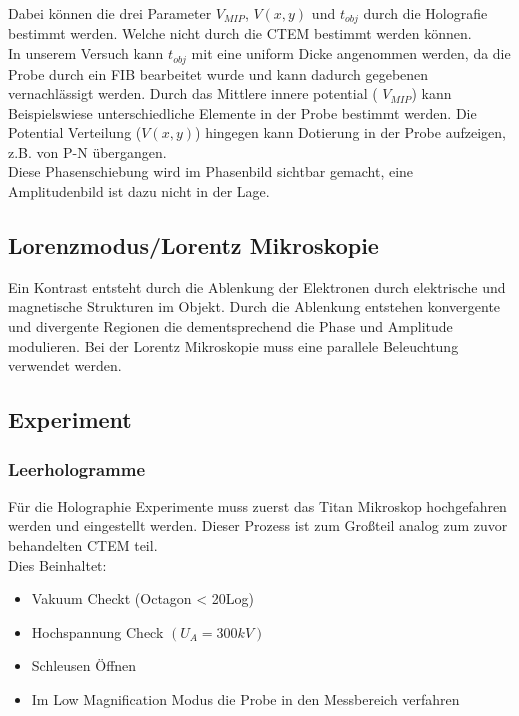 Dabei können die drei Parameter \(V_{MIP}\), \(V(x,y)\) und \(t_{obj}\) durch die Holografie bestimmt werden. Welche nicht durch die CTEM bestimmt werden können.\\
In unserem Versuch kann \(t_{obj}\) mit eine uniform Dicke angenommen werden, da die Probe durch ein FIB bearbeitet wurde und kann dadurch gegebenen vernachlässigt werden. Durch das Mittlere innere potential ( \(V_{MIP}\)) kann Beispielswiese unterschiedliche Elemente in der Probe bestimmt werden. Die Potential Verteilung (\(V(x,y)\)) hingegen kann Dotierung in der Probe aufzeigen, z.B. von P-N übergangen.\\
Diese Phasenschiebung wird im Phasenbild sichtbar gemacht, eine Amplitudenbild ist dazu nicht in der Lage.

\subsection{Lorenzmodus/Lorentz Mikroskopie}
Ein Kontrast entsteht durch die Ablenkung der Elektronen durch elektrische und magnetische Strukturen im Objekt. Durch die Ablenkung entstehen konvergente und divergente Regionen die dementsprechend die Phase und Amplitude modulieren. Bei der Lorentz Mikroskopie muss eine parallele Beleuchtung verwendet werden.

\subsection{Experiment}
\subsubsection{Leerhologramme}
Für die Holographie Experimente muss zuerst das Titan Mikroskop hochgefahren werden und eingestellt werden. Dieser Prozess ist zum Großteil analog zum zuvor behandelten CTEM teil.\\
Dies Beinhaltet:
\begin{itemize}
\item Vakuum Checkt (Octagon < 20Log)
\item Hochspannung Check \( (U_A = 300kV) \)
\item Schleusen Öffnen
\item Im Low Magnification Modus die Probe in den Messbereich verfahren
\end{itemize}

